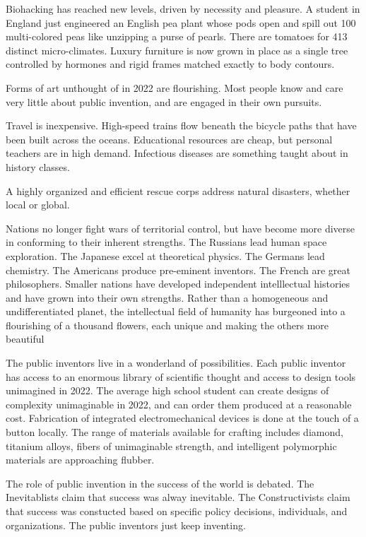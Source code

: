 \documentclass[
	fontsize=10pt, %
	twoside=false, %
	secnumdepth=1, %
]{kaobook}
\begin{document}
Biohacking has reached new levels, driven by necessity and
pleasure.
A student in England just engineered an English pea plant
whose pods open and spill out 100 multi-colored peas like unzipping
a purse of pearls.
There are tomatoes for 413 distinct micro-climates.
Luxury furniture is now grown in place as a single tree
controlled by hormones and rigid frames
matched exactly to body contours.

Forms of art unthought of in 2022 are flourishing.
Most people know and care very little about public invention,
and are engaged in their own pursuits.

Travel is inexpensive. High-speed trains
flow beneath the bicycle paths that have been built across the oceans.
Educational resources are cheap, but personal teachers are in high demand.
Infectious diseases are something taught about in history classes.

A highly organized and efficient rescue corps address natural disasters,
whether local or global.

Nations no longer fight wars of territorial control,
but have become more diverse in conforming to their inherent strengths.
The Russians lead human space exploration. The Japanese excel at
theoretical physics. The Germans lead chemistry. The Americans produce pre-eminent inventors.
The French are great philosophers.
Smaller nations have developed independent intelllectual histories and have
grown into their own strengths.
Rather than a homogeneous and undifferentiated planet,
the intellectual field of humanity has burgeoned into a flourishing
of a thousand flowers, each unique and making the others more
beautiful

The public inventors live in a wonderland of possibilities.
Each public inventor has access to an enormous library of
scientific thought and access to design tools unimagined in 2022.
The average high school student can create designs of
complexity unimaginable in 2022, and can order them
produced at a reasonable cost.
Fabrication of integrated electromechanical devices is
done at the touch of a button locally.
The range of materials available for crafting includes
diamond, titanium alloys, fibers of unimaginable strength,
and intelligent polymorphic materials are approaching flubber.

The role of public invention in the success of the world is
debated. The Inevitablists claim that success was alway inevitable.
The Constructivists claim that success was constucted based on
specific policy decisions, individuals, and organizations.
The public inventors just keep inventing.
\end{document}
